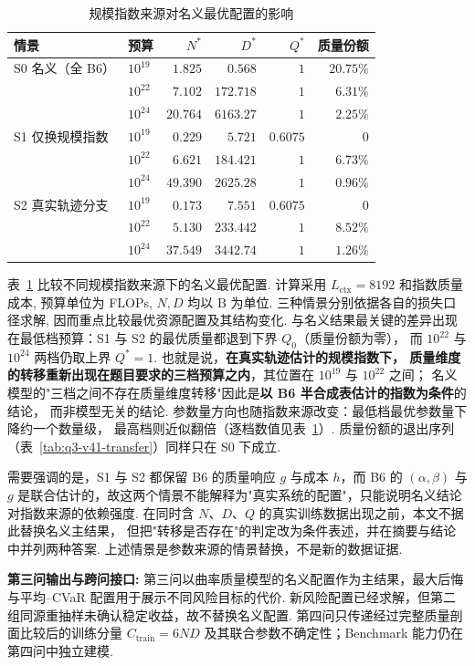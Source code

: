 \begin{table}[htbp]\centering\footnotesize
    \setlength{\tabcolsep}{5pt}
    \caption{规模指数来源对名义最优配置的影响}\label{tab:q3-exponent-source}
    \setlength{\tabcolsep}{3pt}
    \begin{tabular}{llrrrr}\toprule
        情景          & 预算        & $N^*$    & $D^*$     & $Q^*$    & 质量份额      \\\midrule
        S0 名义（全 B6） & $10^{19}$ & $1.825$  & $0.568$   & $1$      & $20.75\%$ \\
                    & $10^{22}$ & $7.102$  & $172.718$ & $1$      & $6.31\%$  \\
                    & $10^{24}$ & $20.764$ & $6163.27$ & $1$      & $2.25\%$  \\\midrule
        S1 仅换规模指数   & $10^{19}$ & $0.229$  & $5.721$   & $0.6075$ & $0$       \\
                    & $10^{22}$ & $6.621$  & $184.421$ & $1$      & $6.73\%$  \\
                    & $10^{24}$ & $49.390$ & $2625.28$ & $1$      & $0.96\%$  \\\midrule
        S2 真实轨迹分支   & $10^{19}$ & $0.173$  & $7.551$   & $0.6075$ & $0$       \\
                    & $10^{22}$ & $5.130$  & $233.442$ & $1$      & $8.52\%$  \\
                    & $10^{24}$ & $37.549$ & $3442.74$ & $1$      & $1.26\%$  \\\bottomrule
    \end{tabular}
\end{table}
表~\ref{tab:q3-exponent-source} 比较不同规模指数来源下的名义最优配置. 计算采用 $L_{\mathrm{ctx}}=8192$ 和指数质量成本, 预算单位为 FLOPs, $N,D$ 均以 $\text{B}$ 为单位. 三种情景分别依据各自的损失口径求解, 因而重点比较最优资源配置及其结构变化.
与名义结果最关键的差异出现在最低档预算：S1 与 S2 的最优质量都退到下界 $Q_0$（质量份额为零），
而 $10^{22}$ 与 $10^{24}$ 两档仍取上界 $Q^*=1$. 也就是说，\textbf{在真实轨迹估计的规模指数下，
    质量维度的转移重新出现在题目要求的三档预算之内}，其位置在 $10^{19}$ 与 $10^{22}$ 之间；
名义模型的"三档之间不存在质量维度转移"因此是\textbf{以 B6 半合成表估计的指数为条件}的结论，
而非模型无关的结论. 参数量方向也随指数来源改变：最低档最优参数量下降约一个数量级，
最高档则近似翻倍（逐档数值见表~\ref{tab:q3-exponent-source}）. 
质量份额的退出序列（表~\ref{tab:q3-v41-transfer}）同样只在 S0 下成立. 

需要强调的是，S1 与 S2 都保留 B6 的质量响应 $g$ 与成本 $h$，而 B6 的 $(\alpha,\beta)$ 与 $g$ 是联合估计的，故这两个情景不能解释为"真实系统的配置"，只能说明名义结论对指数来源的依赖强度. 在同时含 $N$、$D$、$Q$ 的真实训练数据出现之前，本文不据此替换名义主结果， 但把"转移是否存在"的判定改为条件表述，并在摘要与结论中并列两种答案. 上述情景是参数来源的情景替换，不是新的数据证据. 

\textbf{第三问输出与跨问接口:}
第三问以曲率质量模型的名义配置作为主结果，最大后悔与平均--CVaR 配置用于展示不同风险目标的代价. 新风险配置已经求解，但第二组同源重抽样未确认稳定收益，故不替换名义配置. 第四问只传递经过完整质量剖面比较后的训练分量 $C_{\mathrm{train}}=6ND$ 及其联合参数不确定性；Benchmark 能力仍在第四问中独立建模. 
